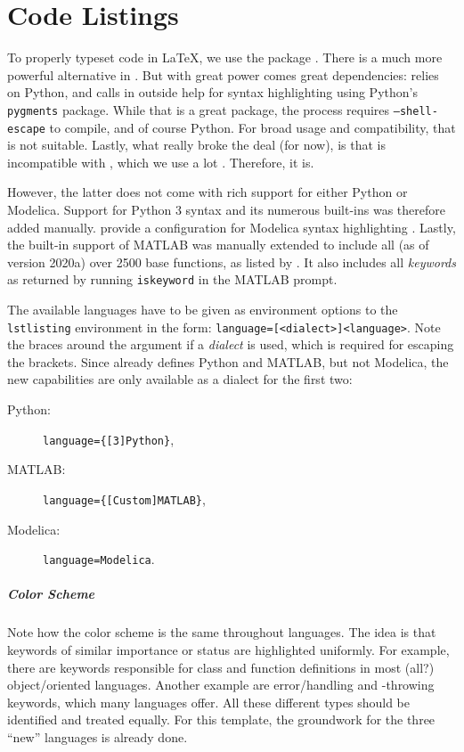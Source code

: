 \chapter{Code Listings}
\label{ch:code-listings}

To properly typeset code in \LaTeX{}, we use the package .
There is a much more powerful alternative in .
But with great power comes great dependencies:  relies on
Python, and calls in outside help for syntax highlighting using Python's
\texttt{pygments} package.
While that is a great package, the process requires \texttt{--shell-escape} to
compile, and of course Python.
For broad usage and compatibility, that is not suitable.
Lastly, what really broke the deal (for now), is that  is
incompatible with , which we use a lot \autocite{egreg_minted_2017}.
Therefore,  it is.

However, the latter does not come with rich support for either Python or
Modelica.
Support for Python 3 syntax and its numerous built-ins was therefore added manually.
 provide a configuration
for Modelica syntax highlighting \autocite{winkler_modelica-toolslistings-modelica_2020}.
Lastly, the built-in support of MATLAB was manually extended to include all
(as of version 2020a) over 2500 base functions, as listed by \citeauthor{mathworks_matlab_2020}
\autocite{mathworks_matlab_2020}.
It also includes all \emph{keywords} as returned by running \texttt{iskeyword} in
the MATLAB prompt.

The available languages have to be given as environment options to the \texttt{lstlisting}
environment in the form: \texttt{language={[<dialect>]<language>}}.
Note the braces around the argument if a \emph{dialect} is used, which is required for
escaping the brackets.
Since  already defines Python and MATLAB, but not Modelica, the
new capabilities are only available as a dialect for the first two:
\begin{description}
    \item[Python:] \texttt{language=\{[3]Python\}},
    \item[MATLAB:] \texttt{language=\{[Custom]MATLAB\}},
    \item[Modelica:] \texttt{language=Modelica}.
\end{description}

\paragraph{Color Scheme}
Note how the color scheme is the same throughout languages.
The idea is that keywords of similar importance or status are highlighted uniformly.
For example, there are keywords responsible for class and function definitions in most
(all?) object\-/oriented languages.
Another example are error\-/handling and -throwing keywords, which many languages
offer.
All these different types should be identified and treated equally.
For this template, the groundwork for the three \enquote{new} languages is already done.

